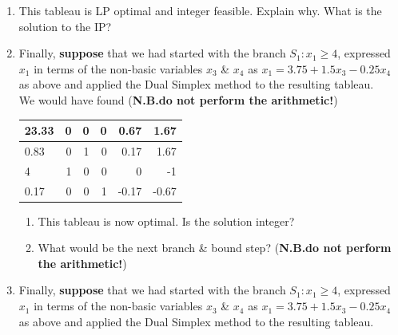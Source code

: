 \documentclass[12pt]{article}
\begin{document}
\begin{itemize}
\begin{enumerate}[(i)]
\begin{enumerate}
					\item This tableau is LP optimal and integer feasible. Explain why. What is the solution to the IP?
					\item Finally, {\bf suppose} that we had started with the branch $S_1: x_1 \ge 4$, expressed  $x_1$ in terms of the non-basic variables $x_3$ \& $x_4$ as $x_1 =3.75+1.5 x_3 -0.25 x_4$ as above and applied the Dual Simplex method to the resulting tableau.\\
					\smallskip
					We would have found  ({\bf N.B.do not perform the arithmetic!})
					\begin{center}
						\begin{tabular}[h]{|l|rrrrr|}\hline
							23.33       &      0&             0&             0&          0.67&          1.67\\ \hline
							0.83&             0&          1&             0&          0.17&          1.67\\
							4 &         1 &            0 &            0 &            0 &        -1\\
							0.17  &           0  &           0  &        1  &       -0.17  &       -0.67\\\hline
						\end{tabular}
					\end{center}
					\begin{enumerate}
						\item 
						This tableau is now optimal. Is the solution integer?
						\item What would be the next branch \& bound step?  ({\bf N.B.do not perform the arithmetic!})
					\end{enumerate}
				      \item Finally, {\bf suppose} that we had started with the branch $S_1: x_1 \ge 4$, expressed  $x_1$ in terms of the non-basic variables $x_3$ \& $x_4$ as $x_1 =3.75+1.5 x_3 -0.25 x_4$ as above and applied the Dual Simplex method to the resulting tableau.
				      

\end{enumerate}
\end{enumerate}
\end{itemize}
\end{document}

